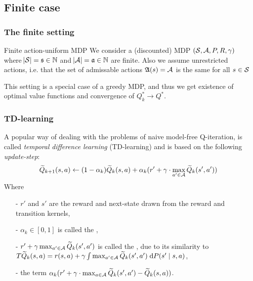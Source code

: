 \documentclass{beamer}[10]
\begin{document}
\subsection{Finite case}

\begin{frame}
  \frametitle{The finite setting}
  \begin{block}{Finite action-uniform MDP}
    We consider a (discounted) MDP $(\mathcal{S}, \mathcal{A}, P, R, \gamma)$ where
    $\abs{\mathcal{S}} = \frak{s} \in \mathbb{N}$ and $\abs{\mathcal{A}} = \frak{a} \in \mathbb{N}$
    are finite.
    Also we assume unrestricted actions, i.e. that the set of admissable
    actions $\frak{A}(s) = \mathcal{A}$ is the same for all $s \in \mathcal{S}$
  \end{block}
  This setting is a special case of a greedy MDP, and thus we get existence
  of optimal value functions and convergence of $Q^*_k \to Q^*$.
\end{frame}

\begin{frame}
  \frametitle{TD-learning}
  \begingroup \footnotesize
  A popular way of dealing with the problems of naive model-free Q-iteration,
  is called \emph{temporal difference learning} (TD-learning)
  and is based on the following \emph{update-step}:
  \begin{equation*}
    \widetilde{Q}_{k+1}(s, a) \leftarrow (1-\alpha_k) \widetilde{Q}_k(s, a)
    + \alpha_k (r' + \gamma \cdot \max_{a' \in \mathcal{A}} \widetilde{Q}_k(s', a'))
  \end{equation*}
  Where
  \begin{itemize}
    \item[-] $r'$ and $s'$ are the reward and next-state drawn from the
      reward and transition kernels,
    \item[-] $\alpha_k \in [0,1]$ is called the ,
    \item[-] $r' + \gamma \max_{a' \in \mathcal{A}} \widetilde{Q}_k(s', a')$
      is called the , due to its similarity to
      $T \widetilde{Q}_k(s, a)
      = r(s, a) + \gamma \int \max_{a' \in \mathcal{A}} \widetilde{Q}_k(s', a')
      \; \mathrm{d} P(s' \mid s, a)$,
    \item[-] the  term
      $ \alpha_k ( r' + \gamma \cdot \max_{a \in \mathcal{A}} \widetilde{Q}_k(s', a')
      - \widetilde{Q}_k(s, a) )$.
  \end{itemize}
  \endgroup
\end{frame}
\end{document}
